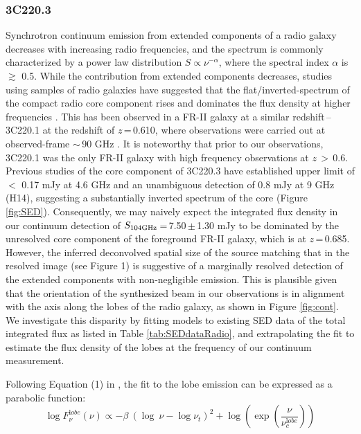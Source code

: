 \documentclass[twocolumn,apj,numberedappendix]{emulateapj}
\begin{document}
\subsubsection{3C220.3}\label{sec:SEDFg}
Synchrotron continuum emission from extended components of a radio galaxy decreases with increasing radio frequencies, 
and the spectrum is commonly characterized by a power law distribution $S \propto \nu^{-\alpha}$, where the 
spectral index $\alpha$ is $\gtrsim$ 0.5. While the contribution from extended components decreases, studies using 
samples of radio galaxies have suggested that the flat/inverted-spectrum of the compact radio core component rises 
and dominates the flux density at higher frequencies \citep{Kellermann81a,Begelman84a}. This has been observed in a FR-II galaxy at a similar redshift\,--\,3C220.1 at the redshift of $z$\,=\,0.610, where observations were carried out at observed-frame $\sim$\,90 GHz \citep{Hardcastle08a}. It is noteworthy that prior to our observations, 3C220.1 was the only FR-II galaxy with high frequency observations at $z$\,$>$\,0.6. Previous studies of the core component of 3C220.3 have established upper 
limit of $<$ 0.17 mJy at 4.6 GHz \citep{Mullin06a} and an unambiguous detection of 0.8 mJy at 9 GHz (H14), suggesting a substantially inverted spectrum of the core (Figure \ref{fig:SED}).
Consequently, we may naively expect the integrated flux density in our continuum detection of $S_{\rm 104GHz}$\,=\,7.50\,$\pm$\,1.30\,\,mJy to be dominated by the unresolved core component of the foreground FR-II galaxy, which is at $z$\,=\,0.685. 
However, the inferred deconvolved spatial size of the source matching that in the resolved image (see Figure 1) is 
suggestive of a marginally resolved detection of the extended components with non-negligible emission. 
This is plausible given that the orientation of the synthesized beam in our observations is in alignment with the 
axis along the 
lobes of the radio galaxy, as shown in Figure \ref{fig:cont}. We investigate this disparity by fitting models to 
existing SED data of the total integrated flux as listed in Table \ref{tab:SEDdataRadio}, and extrapolating the fit to 
estimate the flux density of the lobes at the frequency of our continuum measurement. 

Following Equation (1) in \citet{Cleary07a}, the fit to the lobe emission can be expressed as a parabolic function:
\begin{equation}
\log F_{\nu}^{\mathrm lobe} (\nu) \propto - \beta\ (\log\ \nu - \log \nu_{t})^2  + \log (\exp({\frac{\nu}{\nu_c^{\mathrm lobe}}}))
\end{equation}
\end{document}
